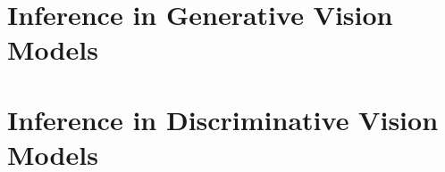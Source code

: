 \documentclass[
  a4paper,
  12pt,
  headsepline,
  numbers=noenddot,
  captions=oneline,
  captions=tableheading,
  BCOR12mm,
  headinclude,
  chapterprefix,
  appendixprefix,
  index=totoc,
  bibliography=totoc
]{scrbook}
\title{\thethesis}
\author{\Large Dissertation\\
\normalsize der Mathematisch-Naturwissenschaftlichen Fakult\"at\\
\normalsize der Eberhard Karls Universit\"at T\"ubingen\\
\normalsize zur Erlangung des Grades eines\\
\normalsize Doktors der Naturwissenschaften\\
\normalsize (Dr.~rer.~nat.)}
\date{\ \\[2ex]\normalsize  vorgelegt von\\
\Large \thename\\
\normalsize aus \thehometown}
\begin{document}
\frontmatter
{}
\maketitle
{}

%
%

\tableofcontents




\mainmatter




\part{Inference in Generative Vision Models}



\part{Inference in Discriminative Vision Models}






\appendix





\setlength{\bibsep}{0pt plus 0.3ex}
% 


\end{document}
